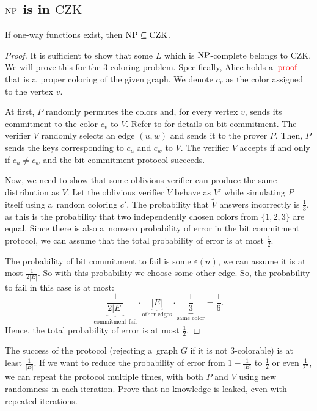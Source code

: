 \subsection{$\operatorname{NP}$ is in $\mathrm{CZK}$}

\begin{theorem}
    If one-way functions exist, then $\operatorname{NP} \subseteq \mathrm{CZK}$.
\end{theorem}

\begin{proof}
    It is sufficient to show that some $L$ which is $\operatorname{NP}$-complete belongs to $\mathrm{CZK}$.
    We will prove this for the 3-coloring problem.
    Specifically, Alice holds a~$\textcolor{red}{\text{proof}}$ that is a~proper coloring of the given graph.
    We denote $c_v$ as the color assigned to the vertex $v$.

    At first, $P$ randomly permutes the colors and, for every vertex $v$, sends its commitment to the color $c_v$ to $V$.
    Refer to  for details on bit commitment.
    The verifier $V$ randomly selects an edge $(u, w)$ and sends it to the prover $P$.
    Then, $P$ sends the keys corresponding to $c_u$ and $c_w$ to $V$.
    The verifier $V$ accepts if and only if $c_u \neq c_w$ and the bit commitment protocol succeeds.

    Now, we need to show that some oblivious verifier can produce the same distribution as $V$.
    Let the oblivious verifier $\tilde{V}$ behave as $V'$ while simulating $P$ itself using a~random coloring $c'$.
    The probability that $\tilde{V}$ answers incorrectly is $\frac{1}{3}$, as this is the probability that two independently chosen colors from $\{ 1, 2, 3 \}$ are equal.
    Since there is also a~nonzero probability of error in the bit commitment protocol, we can assume that the total probability of error is at most $\frac{1}{2}$.
    
    The probability of bit commitment to fail is some $\varepsilon(n)$, we can assume it is at most $\frac{1}{2|E|}$.
    So with this probability we choose some other edge.
    So, the probability to fail in this case is at most:
    \[
    \underbrace{ \frac{1}{2 |E|} }_{ \text{commitment fail} } \cdot \underbrace{ |E| }_{ \text{other edges} } \cdot \underbrace{ \frac{1}{3} }_{ \text{same color} } =\frac{1}{6}.
    \] Hence, the total probability of error is at most $\frac{1}{2}$.
\end{proof}

\begin{exercise}
    The success of the protocol (rejecting a~graph $G$ if it is not 3-colorable) is at least $\frac{1}{|E|}$.
    If we want to reduce the probability of error from $1 - \frac{1}{|E|}$ to $\frac{1}{2}$ or even $\frac{1}{2^{n}}$, we can repeat the protocol multiple times, with both $P$ and $V$ using new randomness in each iteration.
    Prove that no knowledge is leaked, even with repeated iterations.
\end{exercise}

